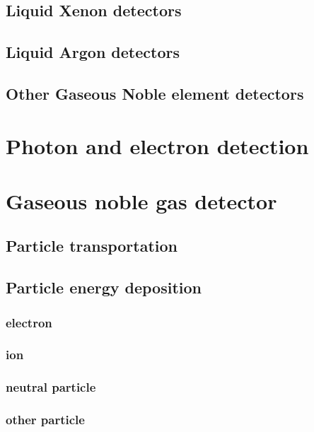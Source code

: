 \subsection{Liquid Xenon detectors}
\subsection{Liquid Argon detectors}
\subsection{Other Gaseous Noble element detectors}
\section{Photon and electron detection}

\section{Gaseous noble gas detector }
\subsection{Particle transportation}

\subsection{Particle energy deposition}
\subsubsection{electron}
\subsubsection{ion}
\subsubsection{neutral particle}
\subsubsection{other particle}
